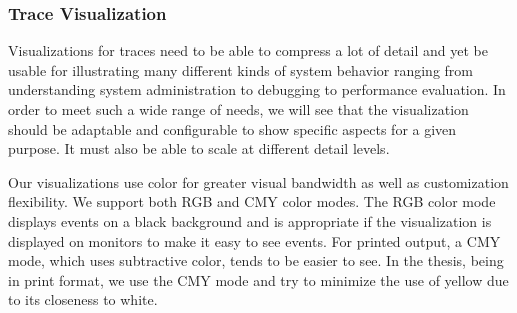 
\subsubsection{Trace Visualization}
\label{sec:lviz-vis}

Visualizations for traces need to be able to compress a lot of detail
and yet be usable for illustrating many different
kinds of system behavior ranging from understanding
system administration to debugging to performance evaluation.
In order to meet such a wide range of needs, we will see that the visualization
should be adaptable and configurable to show specific aspects for a
given purpose.  It must also be able to scale at different detail levels.


Our visualizations use color for greater visual
bandwidth as well as customization flexibility.
We support both RGB and CMY color modes.
The RGB color mode displays events on a black background
and is appropriate if the visualization is displayed on monitors to
make it easy to see events.
For printed output, a CMY mode, which uses subtractive color,
tends to be easier to see.
In the thesis, being in print format, we use the CMY mode
and try to minimize the use of yellow due to its closeness to white.


